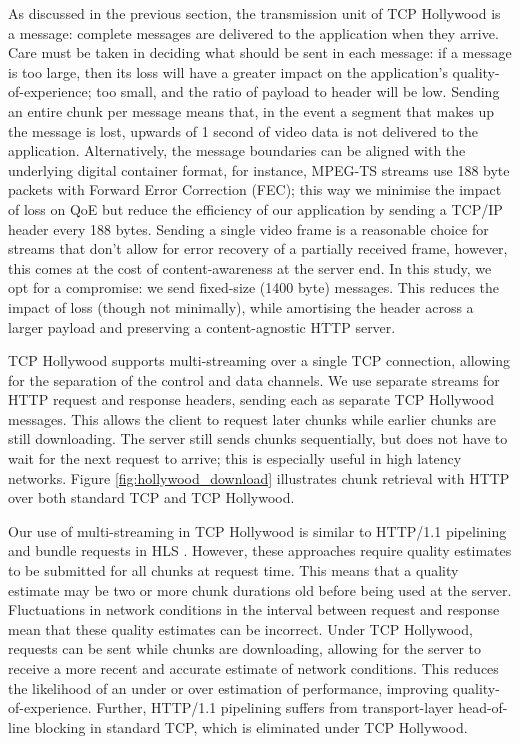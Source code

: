 As discussed in the previous section, the transmission unit of TCP Hollywood is a message:
complete messages are delivered to the application when they arrive. Care must be taken in
deciding what should be sent in each message: if a message is too large, then its loss
will have a greater impact on the application's quality-of-experience; too small, and the
ratio of payload to header will be low. Sending an entire chunk per message means that,
in the event a segment that makes up the message is lost, upwards of 1 second of video
data is not delivered to the application. Alternatively, the message boundaries can be aligned with the underlying digital container format, for instance, MPEG-TS streams use 188 byte packets with Forward Error Correction (FEC); this way we minimise the impact of loss on QoE but reduce the efficiency of our application by sending a TCP/IP header every 188 bytes. Sending a single video frame is a reasonable choice for streams that don't allow for error recovery of a partially received frame, however, this comes at the cost of content-awareness at the server end. In this study, we opt for a compromise: we send fixed-size (1400 byte) messages. This reduces the impact of loss (though not minimally), while amortising the header across a larger payload and preserving a content-agnostic HTTP server.

TCP Hollywood supports multi-streaming over a single TCP connection, allowing for the
separation of the control and data channels. We use separate streams for HTTP request and
response headers, sending each as separate TCP Hollywood messages. This allows the client
to request later chunks while earlier chunks are still downloading. The server still sends
chunks sequentially, but does not have to wait for the next request to arrive; this is
especially useful in high latency networks. Figure \ref{fig:hollywood_download}
illustrates chunk retrieval with HTTP over both standard TCP and TCP Hollywood.

Our use of multi-streaming in TCP Hollywood is similar to HTTP/1.1 pipelining and bundle
requests in HLS \cite{muller2012evaluation}. However, these approaches require quality
estimates to be submitted for all chunks at request time. This means that a quality
estimate may be two or more chunk durations old before being used at the server.
Fluctuations in network conditions in the interval between request and response mean that
these quality estimates can be incorrect. Under TCP Hollywood, requests can be sent while
chunks are downloading, allowing for the server to receive a more recent and accurate
estimate of network conditions. This reduces the likelihood of an under or over estimation
of performance, improving quality-of-experience. Further, HTTP/1.1 pipelining suffers
from transport-layer head-of-line blocking in standard TCP, which is eliminated under TCP Hollywood.

